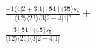 \documentclass[varwidth, border=5pt]{standalone}
\begin{document}
\begin{my}
$\begin{gathered}
\scriptscriptstyle\frac{-1⟨4|2+3|1][𝟓1]⟨3𝟓⟩s_{𝟓}}{⟨12⟩⟨23⟩⟨3|2+4|1]²} +\\
\scriptscriptstyle\frac{3[𝟓1]⟨4𝟓⟩s_{𝟓}}{⟨12⟩⟨23⟩⟨3|2+4|1]} \phantom{+}
\end{gathered}$
\end{my}
\end{document}
